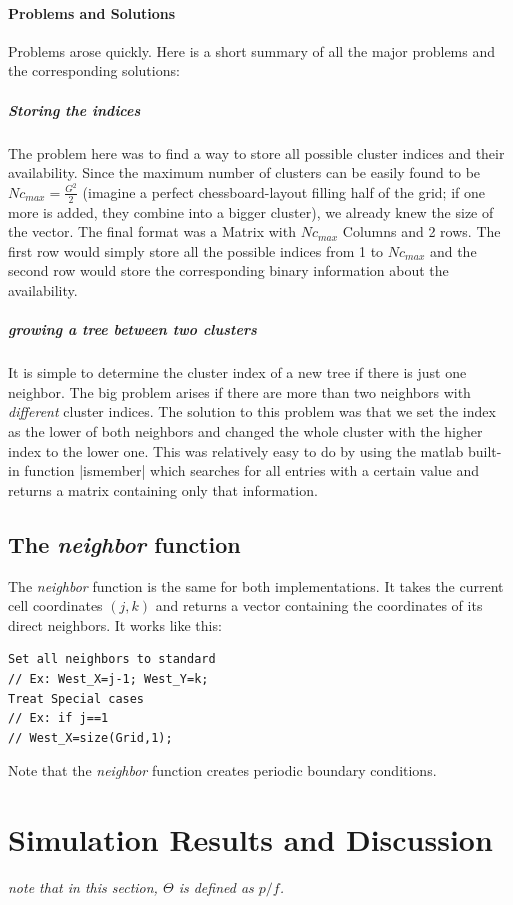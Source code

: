 \documentclass[11pt]{article}
\begin{document}
 \paragraph * {Problems and Solutions}
Problems arose quickly. Here is a short summary of all the major problems and the corresponding solutions:
\subparagraph {Storing the indices}
The problem here was to find a way to store all possible cluster indices and their availability. Since the maximum number of clusters can be easily found to be $Nc_{max}= \frac{G^2}{2}$  (imagine a perfect chessboard-layout filling half of the grid; if one more is added, they combine into a bigger cluster), we already knew the size of the vector. The final format was a Matrix with $Nc_{max}$ Columns and 2 rows. The first row would simply store all the possible indices from 1 to $Nc_{max}$ and the second row would store the corresponding binary information about the availability.
\subparagraph{growing a tree between two clusters}
It is simple to determine the cluster index of a new tree if there is just one neighbor. The big problem arises if there are more than two neighbors with \emph{different} cluster indices. The solution to this problem was that we set the index as the lower of both neighbors and changed the whole cluster with the higher index to the lower one. This was relatively easy to do by using the matlab built-in function |ismember| which searches for all entries with a certain value and returns a matrix containing only that information. 

\subsection{The \emph{neighbor} function}
The \emph{neighbor} function is the same for both implementations. It takes the current cell coordinates  $(j,k)$ and returns a vector containing the coordinates of its direct neighbors. It works like this:
\begin{verbatim}
Set all neighbors to standard
// Ex: West_X=j-1; West_Y=k;
Treat Special cases
// Ex: if j==1
// West_X=size(Grid,1);
\end{verbatim}
Note that the \emph{neighbor} function creates periodic boundary conditions. 


\section{Simulation Results and Discussion}
\emph{note that in this section, $\Theta$ is defined as $p/f$.}
\end{document}
